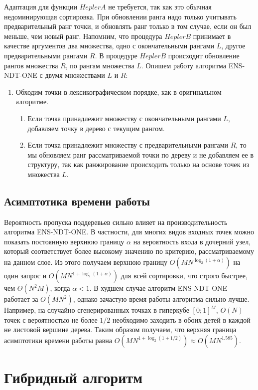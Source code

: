 Адаптация для функции $HeplerA$ не требуется, так как это обычная недоминирующая сортировка. При обновлении ранга надо только учитывать предварительный ранг точки, и обновлять ранг только в том случае, если он был меньше, чем новый ранг. Напомним, что процедура $HeplerB$ принимает в качестве аргументов два множества, одно с окончательными рангами $L$, другое предварительными рангами $R$. В процедуре $HeplerB$ происходит обновление рангов множества $R$, по рангам множества $L$. Опишем работу алгоритма ENS-NDT-ONE с двумя множествами $L$ и $R$: 
\begin{enumerate}
  \item Обходим точки в лексикографическом порядке, как в оригинальном алгоритме.
  \begin{enumerate}
      \item Если точка принадлежит множеству с окончательными рангами $L$, добавляем точку в дерево с текущим рангом.
      \item Если точка принадлежит множеству с предварительными рангами $R$, то мы обновляем ранг рассматриваемой точки по дереву и не добавляем ее в структуру, так как ранжирование происходить только на основе точек из множества $L$.
  \end{enumerate}
\end{enumerate}

\subsection{Асимптотика времени работы}

Вероятность пропуска поддеревьев сильно влияет на производительность алгоритма ENS-NDT-ONE. В частности, для многих видов входных точек можно показать постоянную верхнюю границу $\alpha$ на вероятность входа в дочерний узел, который соответствует более высокому значению по критерию, рассматриваемому на данном слое. Из этого получаем верхнюю границу $O(MN^{\log_2(1+\alpha)})$ на один запрос и $O(MN^{1+\log_2(1+\alpha)})$ для всей сортировки, что строго быстрее, чем $\Theta(N^2M)$, когда $\alpha<1$. В худшем случае алгоритм ENS-NDT-ONE работает за $O(MN^2)$, однако зачастую время работы алгоритма сильно лучше. Например, на случайно сгенерированных точках в гиперкубе $[0; 1]^M$, $O(N)$ точек с вероятностью не более $1/2$ необходимо заходить в обоих детей в каждой не листовой вершине дерева. Таким образом получаем, что верхняя граница асимптотики времени работы равна $O(MN^{1+\log_2(1+1/2)}) \approx O(MN^{1.585})$.

\section{Гибридный алгоритм}

